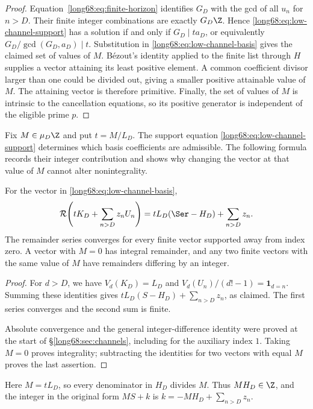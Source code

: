 \begin{proof}
Equation~\eqref{long68:eq:finite-horizon} identifies $G_D$ with the gcd of
all $u_n$ for $n>D$. Their finite integer combinations are exactly
$G_D\Z$. Hence \eqref{long68:eq:low-channel-support} has a solution if
and only if $G_D\mid ta_D$, or equivalently
$G_D/\gcd(G_D,a_D)\mid t$. Substitution in
\eqref{long68:eq:low-channel-basis} gives the claimed set of values of $M$.
B\'ezout's identity applied to the finite list through $H$ supplies a
vector attaining its least positive element. A common coefficient divisor
larger than one could be divided out, giving a smaller positive attainable
value of $M$. The attaining vector is therefore primitive. Finally, the set of
values of $M$ is intrinsic to the cancellation equations, so its positive
generator is independent of the eligible prime $p$.
\end{proof}

Fix $M\in\mu_D\Z$ and put $t=M/L_D$. The support equation
\eqref{long68:eq:low-channel-support} determines which basis coefficients
are admissible. The following formula records their integer contribution
and shows why changing the vector at that value of $M$ cannot alter
nonintegrality.

\begin{theorem}\label{long68:res:residual-transparency}
For the vector in \eqref{long68:eq:low-channel-basis},
\[
 \mathcal R\!\left(tK_D+\sum_{n>D}z_nU_n\right)
 =tL_D(\Ser-H_D)+\sum_{n>D}z_n.
\]
The remainder series converges for every finite vector supported away from
index zero.  A vector with $M=0$ has integral remainder, and any two finite
vectors with the same value of $M$ have remainders differing by an integer.
\end{theorem}

\begin{proof}
For $d>D$, we have $V_d(K_D)=L_D$ and
$V_d(U_n)/(d!-1)=\mathbf1_{d=n}$. Summing these identities gives
$tL_D(S-H_D)+\sum_{n>D}z_n$, as claimed. The first series converges and
the second sum is finite.

Absolute convergence and the general integer-difference identity were
proved at the start of \S\ref{long68:sec:channels}, including for the
auxiliary index $1$. Taking $M=0$ proves integrality;
subtracting the identities for two vectors with equal $M$ proves the
last assertion.
\end{proof}

Here $M=tL_D$, so every denominator in $H_D$ divides $M$. Thus
$MH_D\in\Z$, and the integer in the original form $MS+k$ is
$k=-MH_D+\sum_{n>D}z_n$.

